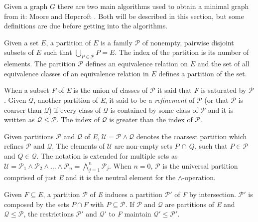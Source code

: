 {Given a graph $G$ there are two main algorithms used to obtain a minimal graph from it: Moore and Hopcroft \cite{berstel.10}. Both will be described in this section, but some definitions are due before getting into the algorithms.

\begin{definition}\label{def:partition}
Given a set $E$, a partition of $E$ is a family $\mathcal{P}$ of nonempty, pairwise disjoint subsets of $E$ such that $\bigcup_{P\in\mathcal{P}}P = E $. The index of the partition is its number of elements. The partition $\mathcal{P}$ defines an equivalence relation on $E$ and the set of all equivalence classes of an equivalence relation in $E$ defines a partition of the set.
\end{definition}

When a subset \textit{F} of \textit{E} is the union of classes of $\mathcal{P}$ it said that \textit{F} is saturated by $\mathcal{P}$. Given $\mathcal{Q}$, another partition of \textit{E}, it said to be a \textit{refinement} of $\mathcal{P}$ (or that $\mathcal{P}$ is coarser than $\mathcal{Q}$) if every class of $\mathcal{Q}$ is contained by some class of $\mathcal{P}$ and it is written as $\mathcal{Q} \leq \mathcal{P}$. The index of $\mathcal{Q}$ is greater than the index of $\mathcal{P}$.

Given partitions $\mathcal{P}$ and $\mathcal{Q}$ of \textit{E}, $\mathcal{U} = \mathcal{P}\wedge\mathcal{Q}$ denotes the coarsest partition which refines $\mathcal{P}$ and $\mathcal{Q}$. The elements of $\mathcal{U}$ are non-empty sets $P\,\cap\,Q$, such that $P \in\mathcal{P}$ and 	$Q \in\mathcal{Q}$. The notation is extended for multiple sets as $\mathcal{U} = \mathcal{P}_1 \wedge \mathcal{P}_2 \wedge \ldots \wedge \mathcal{P}_n = \bigwedge\limits_{j=1}^n\mathcal{P}_j$. When $n=0$,  $\mathcal{P}$ is the universal partition comprised of just \textit{E} and it is the neutral element for the $\wedge$-operation.

Given $F\subseteq E$, a partition $\mathcal{P}$ of \textit{E} induces a partition $\mathcal{P}'$  
of \textit{F} by intersection. $\mathcal{P}'$ is composed by the sets $P\cap F$ with $P\subseteq \mathcal{P}$. If $\mathcal{P}$ and $\mathcal{Q}$ are partitions of \textit{E} and $\mathcal{Q} \leq \mathcal{P}$, the restrictions $\mathcal{P}'$ and $\mathcal{Q}'$ to \textit{F} maintain $\mathcal{Q}' \leq \mathcal{P}'$.



}
